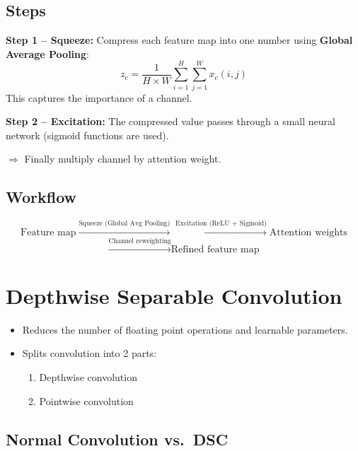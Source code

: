 \documentclass[12pt,a4paper]{article}
\begin{document}
\subsection{Steps}

\textbf{Step 1 -- Squeeze:} Compress each feature map into one number using \textbf{Global Average Pooling}:
\[
z_c = \frac{1}{H \times W} \sum_{i=1}^{H}\sum_{j=1}^{W} x_c(i,j)
\]
This captures the importance of a channel.

\textbf{Step 2 -- Excitation:} The compressed value passes through a small neural network (sigmoid functions are used).

$\Rightarrow$ Finally multiply channel by attention weight.

\subsection{Workflow}

\[
\text{Feature map} \xrightarrow{\text{Squeeze (Global Avg Pooling)}} \xrightarrow{\text{Excitation (ReLU + Sigmoid)}} \text{Attention weights}
\]
\[
\xrightarrow{\text{Channel reweighting}} \text{Refined feature map}
\]

\section{Depthwise Separable Convolution}

\begin{definitionbox}
\begin{itemize}
  \item Reduces the number of floating point operations and learnable parameters.
  \item Splits convolution into 2 parts:
        \begin{enumerate}
          \item Depthwise convolution
          \item Pointwise convolution
        \end{enumerate}
\end{itemize}
\end{definitionbox}

\subsection{Normal Convolution vs.\ DSC}
\end{document}

